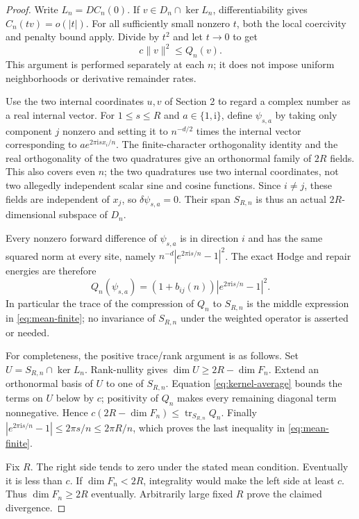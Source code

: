 \documentclass[11pt]{article}
\begin{document}
\begin{proof}
Write $L_n=DC_n(0)$. If $v\in D_n\cap\ker L_n$, differentiability gives
$C_n(tv)=o(|t|)$. For all sufficiently small nonzero $t$, both the local
coercivity and penalty bound apply. Divide by $t^2$ and let $t\to0$ to get
\begin{equation}\label{eq:kernel-average}
 c\|v\|^2\leq Q_n(v).
\end{equation}
This argument is performed separately at each $n$; it does not impose
uniform neighborhoods or derivative remainder rates.

Use the two internal coordinates $u,v$ of Section 2 to regard a complex
number as a real internal vector. For $1\leq s\leq R$ and $a\in\{1,\mathrm{i}\}$,
define $\psi_{s,a}$ by taking only component $j$ nonzero and setting it to
$n^{-d/2}$ times the internal vector corresponding to
$a e^{2\pi\mathrm{i}s x_i/n}$. The finite-character orthogonality identity
and the real orthogonality of the two quadratures give an orthonormal
family of $2R$ fields. This also covers even $n$; the two quadratures use
two internal coordinates, not two allegedly independent scalar sine and
cosine functions. Since $i\ne j$, these fields are independent of $x_j$,
so $\delta\psi_{s,a}=0$. Their span $S_{R,n}$ is thus an actual
$2R$-dimensional subspace of $D_n$.

Every nonzero forward difference of $\psi_{s,a}$ is in direction $i$ and
has the same squared norm at every site, namely
$n^{-d}|e^{2\pi\mathrm{i}s/n}-1|^2$. The exact Hodge and repair energies are
therefore
\[
 Q_n(\psi_{s,a})=(1+b_{ij}(n))|e^{2\pi\mathrm{i}s/n}-1|^2.
\]
In particular the trace of the compression of $Q_n$ to $S_{R,n}$ is the
middle expression in \eqref{eq:mean-finite}; no invariance of $S_{R,n}$
under the weighted operator is asserted or needed.

For completeness, the positive trace/rank argument is as follows. Set
$U=S_{R,n}\cap\ker L_n$. Rank-nullity gives
$\dim U\geq2R-\dim F_n$. Extend an orthonormal basis of $U$ to one of
$S_{R,n}$. Equation \eqref{eq:kernel-average} bounds the terms on $U$
below by $c$; positivity of $Q_n$ makes every remaining diagonal term
nonnegative. Hence $c(2R-\dim F_n)\leq\operatorname{tr}_{S_{R,n}}Q_n$.
Finally $|e^{2\pi\mathrm{i}s/n}-1|\leq2\pi s/n\leq2\pi R/n$, which proves
the last inequality in \eqref{eq:mean-finite}.

Fix $R$. The right side tends to zero under the stated mean condition.
Eventually it is less than $c$. If $\dim F_n<2R$, integrality would make
the left side at least $c$. Thus $\dim F_n\geq2R$ eventually. Arbitrarily
large fixed $R$ prove the claimed divergence.
\end{proof}
\end{document}
